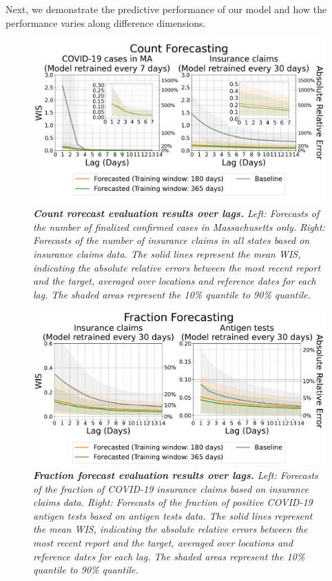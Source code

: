 Next, we demonstrate the predictive performance of our model and how the performance varies along difference dimensions. 

\begin{figure}[h!]
    \centering
    \includegraphics[width=\textwidth]{figs/experiment_count_result_evl_general.pdf}
    \caption{\emph{\textbf{Count rorecast evaluation results over lags.} Left: Forecasts of the number of finalized confirmed cases in Massachusetts only. Right: Forecasts of the number of insurance claims in all states based on insurance claims data. The solid lines represent the mean WIS, indicating the absolute relative errors between the most recent report and the target, averaged over locations and reference dates for each lag. The shaded areas represent the 10\% quantile to 90\% quantile.}}
\end{figure}

\begin{figure}[h!]
    \centering
    \includegraphics[width=\textwidth]{figs/experiment_frc_result_evl_general.pdf}
    \caption{\emph{\textbf{Fraction forecast evaluation results over lags.} Left: Forecasts of the fraction of COVID-19 insurance claims based on insurance claims data. Right: Forecasts of the fraction of positive COVID-19 antigen tests based on antigen tests data. The solid lines represent the mean WIS, indicating the absolute relative errors between the most recent report and the target, averaged over locations and reference dates for each lag. The shaded areas represent the 10\% quantile to 90\% quantile.}}
\end{figure}

